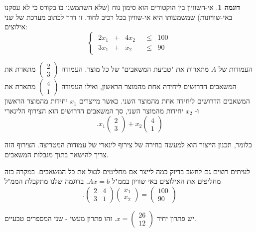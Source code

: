\documentclass[12pt]{report}
\theoremstyle{plain}
\theoremstyle{definition}
\newtheorem{example}{דוגמה}[chapter]
\newcommand{\0}{\mathbf{0}}
\begin{document}
\begin{example}
אי-השוויון בין הוקטורים הוא סימון נוח (שלא השתמשנו בו בקורס כי לא עסקנו באי-שוויונות) שמשמעותו היא אי-שוויון בכל רכיב לחוד.
זו דרך לכתוב מערכת של שני אילוצים:
$$
\begin{cases}
\begin{alignedat}{3}
2x_1 &{}+{}& 4x_2 &{}& \leq{}& 100 \\
3x_1 &{}+{}&  x_2 &{}& \leq{}& 90
\end{alignedat}
\end{cases}
$$

העמודות של
$A$
מתארות את "טביעת המשאבים" של כל מוצר. העמודה
$\begin{pmatrix}
2 \\
3
\end{pmatrix}$
מתארת את המשאבים הדרושים ליחידה אחת מהמוצר הראשון, ואילו העמודה
$\begin{pmatrix}
4 \\
1\end{pmatrix}$
מתארת את המשאבים הדרושים ליחידה אחת מהמוצר השני. כאשר מייצרים
$x_1$
יחידות מהמוצר הראשון ו-
$x_2$
יחידות מהמוצר השני, סך המשאבים הדרושים הוא הצירוף הלינארי
$$
.x_1
\begin{pmatrix}
2 \\
3
\end{pmatrix}
+
x_2
\begin{pmatrix}
4 \\
1
\end{pmatrix}
$$

כלומר, תכנון הייצור הוא למעשה בחירה של צירוף לינארי של עמודות המטריצה.
הצירוף הזה צריך להישאר בתוך מגבלות המשאבים.

לעיתים רוצים גם לחשב בדיוק כמה לייצר אם מחליטים לנצל את כל המשאבים.
במקרה כזה מחליפים את האילוצים באי-שוויון בממ"ל
$A x = b$.
בדוגמה שלנו מתקבלת הממ"ל
$$
.\begin{pmatrix}
2 & 4 \\
3 & 1
\end{pmatrix}
\begin{pmatrix}
x_1 \\
x_2
\end{pmatrix}
=
\begin{pmatrix}
100 \\
90
\end{pmatrix}
$$

יש פתרון יחיד 
$x=\begin{pmatrix}26 \\ 12\end{pmatrix}$. 
זהו פתרון מעשי - שני המספרים טבעיים.

\end{example}
\end{document}
